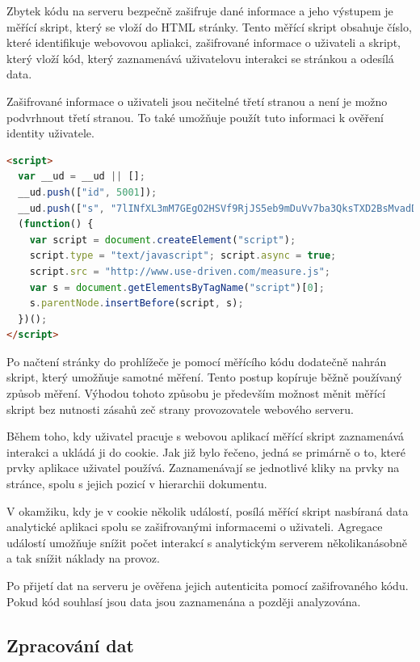 \documentclass[bc,female,java,dept456]{diploma}						%
\begin{document}
Zbytek kódu na serveru bezpečně zašifruje dané informace a jeho výstupem je měřící skript, který se vloží do HTML stránky. Tento měřící skript obsahuje číslo, které identifikuje webovovou apliakci, zašifrované informace o uživateli a skript, který vloží kód, který zaznamenává uživatelovu interakci se stránkou a odesílá data.

Zašifrované informace o uživateli jsou nečitelné třetí stranou a není je možno podvrhnout třetí stranou. To také umožňuje použít tuto informaci k ověření identity uživatele.

\begin{lstlisting}[label=src:html,caption=Měřící skript,language=HTML]
<script> 
  var __ud = __ud || [];  
  __ud.push(["id", 5001]);
  __ud.push(["s", "7lINfXL3mM7GEgO2HSVf9RjJS5eb9mDuVv7ba3QksTXD2BsMvadDPeU-CoIzid5PDqJI6gCOi0EjmEGtI6XSDbu9at9vY8fw6rwssCDJVA2dfuZYF7kDwzpjzivNO OfAXQls78FzwcjDhc-gxwHohMAa0l9mb7MMlV5JcDDnx7A"]);
  (function() {
    var script = document.createElement("script");
    script.type = "text/javascript"; script.async = true;
    script.src = "http://www.use-driven.com/measure.js";
    var s = document.getElementsByTagName("script")[0]; 
    s.parentNode.insertBefore(script, s);
  })();
</script> 
\end{lstlisting}


Po načtení stránky do prohlížeče je pomocí měřícího kódu dodatečně nahrán skript, který umožňuje samotné měření. Tento postup kopíruje běžně používaný způsob měření. Výhodou tohoto způsobu je především možnost měnit měřící skript bez nutnosti zásahů zeč strany provozovatele webového serveru.

Během toho, kdy uživatel pracuje s webovou aplikací měřící skript zaznamenává interakci a ukládá ji do cookie. Jak již bylo řečeno, jedná se primárně o to, které prvky aplikace uživatel používá. Zaznamenávají se jednotlivé kliky na prvky na stránce, spolu s jejich pozicí v hierarchii dokumentu.

V okamžiku, kdy je v cookie několik událostí, posílá měřící skript nasbíraná data analytické aplikaci spolu se zašifrovanými informacemi o uživateli. Agregace událostí umožňuje snížit počet interakcí s analytickým serverem několikanásobně a tak snížit náklady na provoz.

Po přijetí dat na serveru je ověřena jejich autenticita pomocí zašifrovaného kódu. Pokud kód souhlasí jsou data jsou zaznamenána a později analyzována.




\subsection{Zpracování dat}
\end{document}
